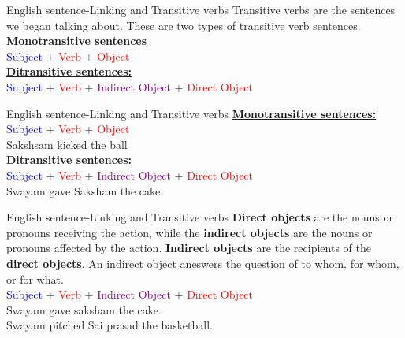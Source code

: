 \documentclass{beamer}
\begin{document}
\begin{frame}{English sentence-Linking and Transitive verbs}
\centering
Transitive verbs are the sentences we began talking about. These are two types of transitive verb sentences.\\
\vspace{0.2in}
\textbf{\underline{Monotransitive sentences}}\\
\vspace{0.2in}
\textcolor{blue}{Subject} + \textcolor{red}{Verb} + \textcolor{red}{Object}\\
\vspace{0.2in}
\textbf{\underline{Ditransitive sentences:}}\\
\vspace{0.2in}
\textcolor{blue}{Subject} + \textcolor{red}{Verb} + \textcolor{purple}{Indirect Object} + \textcolor{red}{Direct Object}

    
\end{frame}
\begin{frame}{English sentence-Linking and Transitive verbs}
\centering
\textbf{\underline{Monotransitive sentences:}}\\ 
\vspace{0.2in}
\textcolor{blue}{Subject} + \textcolor{red}{Verb} + \textcolor{red}{Object}\\
\vspace{0.2in}
Sakshsam kicked the ball\\
\vspace{0.2in}
\textbf{\underline{Ditransitive sentences:}}\\
\vspace{0.2in}
\textcolor{blue}{Subject} + \textcolor{red}{Verb} + \textcolor{purple}{Indirect Object} + \textcolor{red}{Direct Object}\\
\vspace{0.2in}
Swayam gave Saksham the cake.
\end{frame}
\begin{frame}{English sentence-Linking and Transitive verbs}
\centering
\textbf{Direct objects} are the nouns or pronouns receiving the action, while the \textbf{indirect objects} are the nouns or pronouns affected by the action. \textbf{Indirect objects} are the recipients of the \textbf{direct objects}. An indirect object aneswers the question of to whom, for whom, or for what.\\
\vspace{0.2in}
\textcolor{blue}{Subject} + \textcolor{red}{Verb} + \textcolor{purple}{Indirect Object} + \textcolor{red}{Direct Object}\\
\vspace{0.2in}
Swayam gave saksham the cake.\\
\vspace{0.2in}
Swayam pitched Sai prasad the basketball.
\end{frame}
\end{document}

